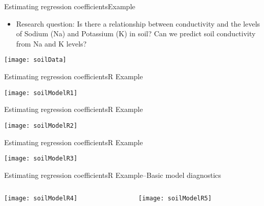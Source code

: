 \documentclass[xcolor=dvipsnames]{beamer}
\begin{document}
\begin{frame}{Estimating regression coefficients}{Example}
	\begin{itemize}
		\item Research question: Is there a relationship between conductivity and the levels of Sodium (Na) and Potassium (K) in soil? Can we predict soil conductivity from Na and K levels?
	\end{itemize}
	\begin{center}
		\texttt{[image: soilData]}
	\end{center}
\end{frame}

\begin{frame}{Estimating regression coefficients}{R Example}
	\begin{center}
		\texttt{[image: soilModelR1]}
	\end{center}
\end{frame}

\begin{frame}{Estimating regression coefficients}{R Example}
	\begin{center}
		\texttt{[image: soilModelR2]}
	\end{center}
\end{frame}

\begin{frame}{Estimating regression coefficients}{R Example}
	\begin{center}
		\texttt{[image: soilModelR3]}
	\end{center}
\end{frame}

\begin{frame}{Estimating regression coefficients}{R Example--Basic model diagnostics}
	\begin{columns}
		\begin{column}{.35\textwidth}
			\begin{center}
				\texttt{[image: soilModelR4]}
			\end{center}
		\end{column}

		\begin{column}{.65\textwidth}
			\begin{center}
					\vspace{-6mm}
				\texttt{[image: soilModelR5]}
			\end{center}
		\end{column}
	\end{columns}
\end{frame}
\end{document}
